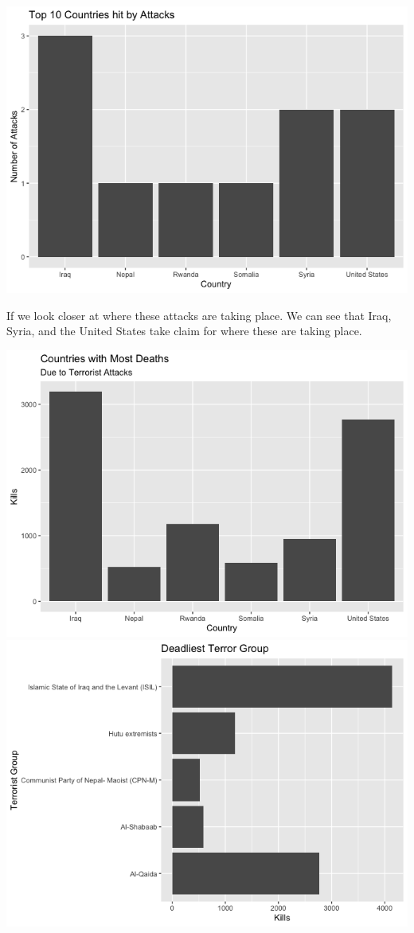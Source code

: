 \documentclass[
]{article}
\begin{document}
\includegraphics{README_files/figure-gfm/unnamed-chunk-15-1.png}

If we look closer at where these attacks are taking place. We can see
that Iraq, Syria, and the United States take claim for where these are
taking place.

\includegraphics{README_files/figure-gfm/unnamed-chunk-16-1.png}
\includegraphics{README_files/figure-gfm/unnamed-chunk-16-2.png}
\end{document}
